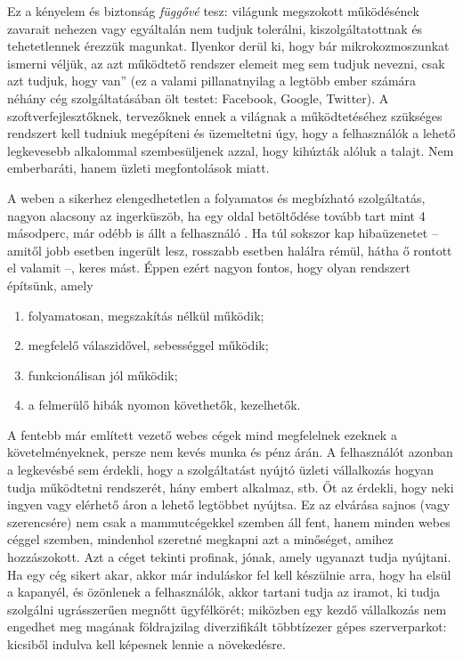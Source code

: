 \documentclass[12pt, a4paper, oneside]{book}
\begin{document}
Ez a kényelem és biztonság \textit{függővé} tesz: világunk megszokott
működésének zavarait nehezen vagy egyáltalán nem tudjuk tolerálni,
kiszolgáltatottnak és tehetetlennek érezzük magunkat. Ilyenkor derül ki, hogy
bár mikrokozmoszunkat ismerni véljük, az azt működtető rendszer elemeit meg sem
tudjuk nevezni, csak azt tudjuk, hogy \glqq{}van\textquotedblright{} (ez a
valami pillanatnyilag a legtöbb ember számára néhány cég szolgáltatásában ölt
testet: Facebook, Google, Twitter). A szoftverfejlesztőknek, tervezőknek ennek
a világnak a működtetéséhez szükséges rendszert kell tudniuk megépíteni és
üzemeltetni úgy, hogy a felhasználók a lehető legkevesebb alkalommal
szembesüljenek azzal, hogy kihúzták alóluk a talajt. Nem emberbaráti, hanem
üzleti megfontolások miatt.

A weben a sikerhez elengedhetetlen a folyamatos és megbízható szolgáltatás,
nagyon alacsony az ingerküszöb, ha egy oldal betöltődése tovább tart mint 4
másodperc, már odébb is állt a felhasználó \citep{AkamaiReport}.  Ha túl
sokszor kap hibaüzenetet -- amitől jobb esetben ingerült lesz, rosszabb esetben
halálra rémül, hátha ő rontott el valamit --, keres mást. Éppen ezért nagyon
fontos, hogy olyan rendszert építsünk, amely 

\begin{enumerate} 
  \item folyamatosan, megszakítás nélkül működik;
  \item megfelelő válaszidővel, sebességgel működik;
  \item funkcionálisan jól működik;
  \item a felmerülő hibák nyomon követhetők, kezelhetők.
\end{enumerate}

A fentebb már említett vezető webes cégek mind megfelelnek ezeknek a
követelményeknek, persze nem kevés munka és pénz árán. A felhasználót azonban a
legkevésbé sem érdekli, hogy a szolgáltatást nyújtó üzleti vállalkozás hogyan
tudja működtetni rendszerét, hány embert alkalmaz, stb. Őt az érdekli, hogy
neki ingyen vagy elérhető áron a lehető legtöbbet nyújtsa. Ez az elvárása
sajnos (vagy szerencsére) nem csak a mammutcégekkel szemben áll fent, hanem
minden webes céggel szemben, mindenhol szeretné megkapni azt a minőséget,
amihez hozzászokott. Azt a céget tekinti profinak, jónak, amely ugyanazt tudja
nyújtani. Ha egy cég sikert akar, akkor már induláskor fel kell készülnie arra,
hogy ha elsül a kapanyél, és özönlenek a felhasználók, akkor tartani tudja az
iramot, ki tudja szolgálni ugrásszerűen megnőtt ügyfélkörét; miközben egy kezdő
vállalkozás nem engedhet meg magának földrajzilag diverzifikált többtízezer
gépes szerverparkot: kicsiből indulva kell képesnek lennie a növekedésre.
\end{document}
